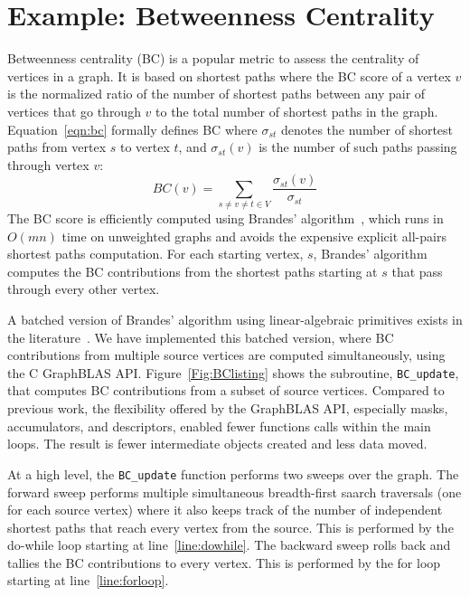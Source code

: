 \section{Example: Betweenness Centrality}
\label{sec:example}


Betweenness centrality (BC) is a popular metric to assess the centrality of 
vertices in a graph. It is based on shortest paths where the BC score of a
vertex $v$ is the normalized ratio of the number of shortest paths between 
any pair of vertices that go through $v$ to the total number of shortest paths 
in the graph.  Equation~\ref{eqn:bc} formally defines BC where $\sigma_{st}$ 
denotes the number of shortest paths from vertex $s$ to vertex $t$, and 
$\sigma_{st}(v)$ is the number of such paths passing through vertex $v$:
\begin{equation}
	BC(v) = \sum_{s \neq v \neq t \in V} \frac{\sigma_{st}(v)}{\sigma_{st}}
\label{eqn:bc}
\end{equation}
The BC score is efficiently computed using Brandes' 
algorithm~\cite{brandes2001faster}, 
which runs in $O(mn)$ time on unweighted graphs and avoids the expensive 
explicit all-pairs shortest paths computation.  For each starting vertex, $s$, 
Brandes' algorithm computes the BC contributions from the shortest paths starting
at $s$ that pass through every other vertex.

A batched version of Brandes' algorithm using linear-algebraic primitives
exists in the literature~\cite{combblas,bader2006designing,robinson2011complex}. 
We have implemented this batched version, where BC contributions from multiple 
source vertices are computed simultaneously, using the C GraphBLAS API. 
Figure~\ref{Fig:BClisting} shows the subroutine, {\tt BC\_update}, that computes
BC contributions from a subset of source vertices. Compared to previous work, the 
flexibility offered by the GraphBLAS API, especially masks, accumulators, 
and descriptors, enabled fewer functions calls within the main loops. The 
result is fewer intermediate objects created and less data moved.

At a high level, the {\tt BC\_update} function performs two sweeps over the 
graph. The forward sweep performs multiple simultaneous
breadth-first saarch traversals (one for each source vertex) where it also keeps track 
of the number of independent shortest paths that reach every vertex from 
the source.  This is performed by the do-while loop starting at 
line~\ref{line:dowhile}. The backward sweep rolls back and tallies the BC 
contributions to every vertex. This is performed by the for loop starting 
at line~\ref{line:forloop}.  

